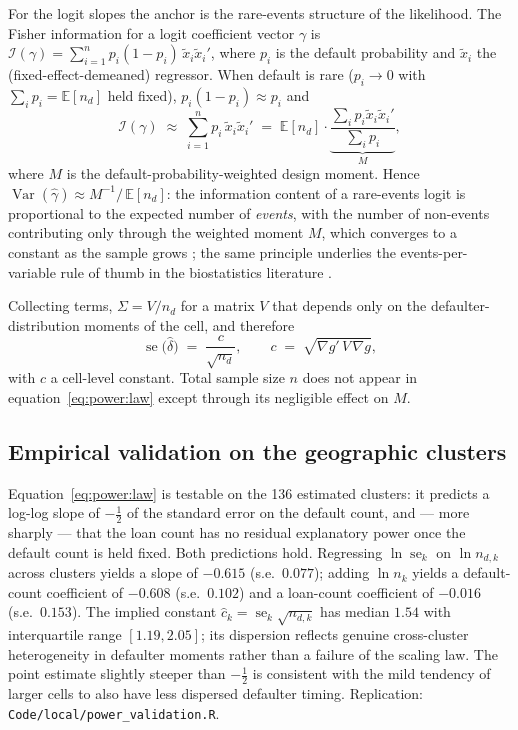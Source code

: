 For the logit slopes the anchor is the rare-events structure of the likelihood. The Fisher information for a logit coefficient vector $\gamma$ is $\mathcal{I}(\gamma) = \sum_{i=1}^{n} p_i (1 - p_i) \, \tilde{x}_i \tilde{x}_i'$, where $p_i$ is the default probability and $\tilde{x}_i$ the (fixed-effect-demeaned) regressor. When default is rare ($p_i \to 0$ with $\sum_i p_i = \mathbb{E}[n_d]$ held fixed), $p_i(1-p_i) \approx p_i$ and
\begin{equation}\label{eq:power:info}
\mathcal{I}(\gamma) \;\approx\; \sum_{i=1}^{n} p_i \, \tilde{x}_i \tilde{x}_i'
\;=\; \mathbb{E}[n_d] \cdot \underbrace{\frac{\sum_i p_i \tilde{x}_i \tilde{x}_i'}{\sum_i p_i}}_{\textstyle M},
\end{equation}
where $M$ is the default-probability-weighted design moment. Hence $\operatorname{Var}(\widehat{\gamma}) \approx M^{-1} / \, \mathbb{E}[n_d]$: the information content of a rare-events logit is proportional to the expected number of \emph{events}, with the number of non-events contributing only through the weighted moment $M$, which converges to a constant as the sample grows \citep{king_logistic_2001}; the same principle underlies the events-per-variable rule of thumb in the biostatistics literature \citep{peduzzi_simulation_1996}.

Collecting terms, $\Sigma = V / n_d$ for a matrix $V$ that depends only on the defaulter-distribution moments of the cell, and therefore
\begin{equation}\label{eq:power:law}
\operatorname{se}\big(\widehat{\delta}\big) \;=\; \frac{c}{\sqrt{n_d}},
\qquad
c \;=\; \sqrt{\nabla g' \, V \, \nabla g},
\end{equation}
with $c$ a cell-level constant. Total sample size $n$ does not appear in equation~\eqref{eq:power:law} except through its negligible effect on $M$.

\subsection{Empirical validation on the geographic clusters}

Equation~\eqref{eq:power:law} is testable on the 136 estimated clusters: it predicts a log-log slope of $-\tfrac12$ of the standard error on the default count, and --- more sharply --- that the loan count has no residual explanatory power once the default count is held fixed. Both predictions hold. Regressing $\ln \operatorname{se}_k$ on $\ln n_{d,k}$ across clusters yields a slope of $-0.615$ (s.e.\ $0.077$); adding $\ln n_k$ yields a default-count coefficient of $-0.608$ (s.e.\ $0.102$) and a loan-count coefficient of $-0.016$ (s.e.\ $0.153$). The implied constant $\widehat{c}_k = \operatorname{se}_k \sqrt{n_{d,k}}$ has median $1.54$ with interquartile range $[1.19, 2.05]$; its dispersion reflects genuine cross-cluster heterogeneity in defaulter moments rather than a failure of the scaling law. The point estimate slightly steeper than $-\tfrac12$ is consistent with the mild tendency of larger cells to also have less dispersed defaulter timing. Replication: \texttt{Code/local/power\_validation.R}.

